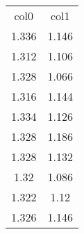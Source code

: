 \begin{table}
\begin{tabular}{cc}
col0 & col1 \\
1.336 & 1.146 \\
1.312 & 1.106 \\
1.328 & 1.066 \\
1.316 & 1.144 \\
1.334 & 1.126 \\
1.328 & 1.186 \\
1.328 & 1.132 \\
1.32 & 1.086 \\
1.322 & 1.12 \\
1.326 & 1.146 \\
\end{tabular}
\end{table}

